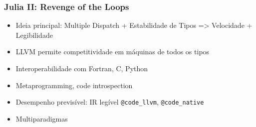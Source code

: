 \documentclass{beamer}
\begin{document}
\begin{darkframes}
  \begin{frame}[fragile]
    \frametitle{Julia II: Revenge of the Loops}
    \begin{itemize}
    \item<1-> Ideia principal: Multiple Dispatch + Estabilidade de Tipos => Velocidade + Legibilidade
    \item<2-> LLVM permite competitividade em máquinas de todos os tipos
    \item<3-> Interoperabilidade com Fortran, C, Python
    \item<4-> Metaprogramming, code introspection
    \item<5-> Desempenho previsível: IR legível \verb+@code_llvm+, \verb+@code_native+
    \item<6-> Multiparadigmas

\end{itemize}
\end{frame}
\end{darkframes}
\end{document}
